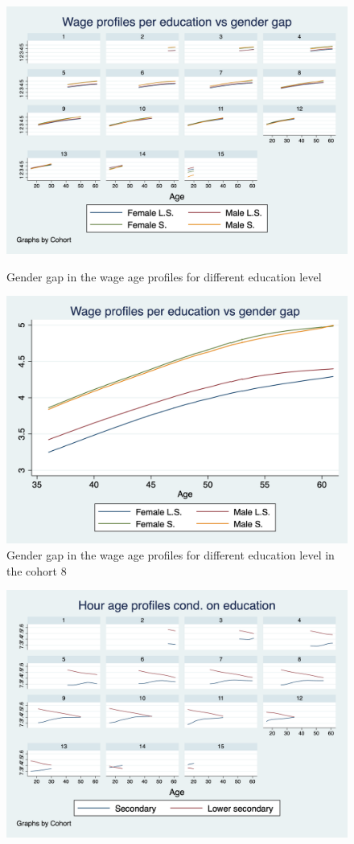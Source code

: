 \documentclass[12pt]{article}
\begin{document}
\begin{center}
\begin{figure}[h]
\end{figure}
\begin{figure}
    \includegraphics[scale=0.4]{graph2.png}
    \caption{\label{fig:w_gend_l}Gender gap in the wage age profiles for different education level}
    \includegraphics[scale=0.4]{graph2_1.png}
    \caption{\label{fig:w_gend_l_cohort8}Gender gap in the wage age profiles for different education level in the cohort
    8}
\end{figure}
\begin{figure}    
    \centering
    \includegraphics[scale=0.4]{graph4.png}

\end{figure}
\end{center}
\end{document}
